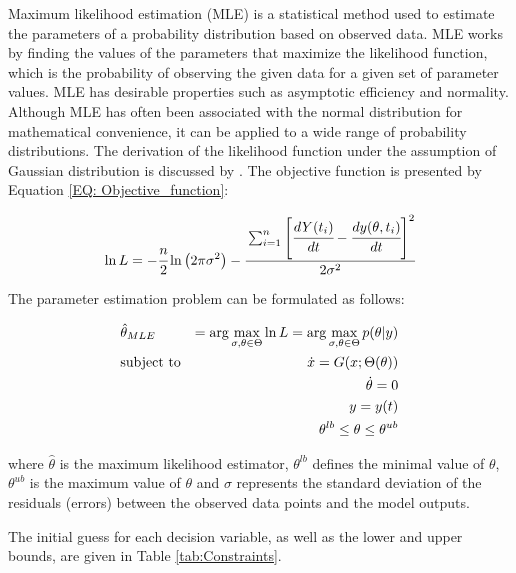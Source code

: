 \documentclass[../Article_Model_Parameters.tex]{subfiles}
\begin{document}
	Maximum likelihood estimation (MLE) is a statistical method used to estimate the parameters of a probability distribution based on observed data. MLE works by finding the values of the parameters that maximize the likelihood function, which is the probability of observing the given data for a given set of parameter values. MLE has desirable properties such as asymptotic efficiency and normality. Although MLE has often been associated with the normal distribution for mathematical convenience, it can be applied to a wide range of probability distributions. The derivation of the likelihood function under the assumption of  Gaussian distribution is discussed by \citet{Himmelblau1970}. The objective function is presented by Equation \ref{EQ: Objective_function}:
	
	{\footnotesize
		\begin{equation} \label{EQ: Objective_function}
			\ln L = -\cfrac{n}{2}  \ln \left(2 \pi \sigma^2\right) 
			- \cfrac{ \sum_{i=1}^{n} \left[  \cfrac{d {Y}(t_i)}{dt} - \cfrac{dy(\theta, t_i)}{dt} \right]^2 }{2 \sigma^2}
		\end{equation}
	}
	
	The parameter estimation problem can be formulated as follows:
	
	{\footnotesize
		\begin{equation}
			\begin{aligned} \label{EQ: Optimization_formulation_MLE}
				&\hat{\theta}_{MLE} &= \arg \max_{\sigma, \theta \in \Theta} \ln L = \arg \max_{\sigma,\theta \in \Theta} p(\theta|y) \\
				&\text{subject to}
				& \dot{ x } = G({\color{black} x};\Theta(\theta)) \\
				&& \dot{\theta} = 0 \\
				&& y = y(t) \\
				&& \theta^{lb} \leq \theta \leq \theta^{ub}
			\end{aligned}
	\end{equation} } 
	
	where $\hat{\theta}$ is the maximum likelihood estimator, $\theta^{lb}$ defines the minimal value of $\theta$, $\theta^{ub}$ is the maximum value of $\theta$ and $\sigma$ represents the standard deviation of the residuals (errors) between the observed data points and the model outputs.
	
	The initial guess for each decision variable, as well as the lower and upper bounds, are given in Table \ref{tab:Constraints}. 
	
\end{document}
